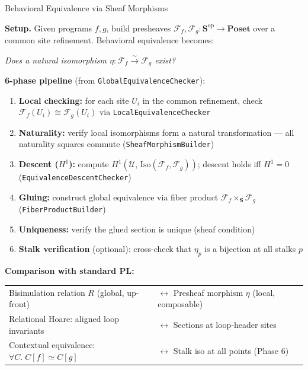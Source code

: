 \documentclass[aspectratio=169,11pt]{beamer}
\newcommand{\Sem}{\mathcal{F}}
\newcommand{\Cat}{\mathbf{S}}
\newcommand{\Poset}{\mathbf{Poset}}
\newcommand{\op}{\mathrm{op}}
\begin{document}
\begin{frame}{Behavioral Equivalence via Sheaf Morphisms}

\textbf{Setup.} Given programs $f, g$, build presheaves
$\Sem_f, \Sem_g : \Cat^{\op} \to \Poset$ over a common site
refinement. Behavioral equivalence becomes:

\vspace{0.2em}
\begin{center}
\emph{Does a natural isomorphism $\eta : \Sem_f \xrightarrow{\sim} \Sem_g$ exist?}
\end{center}

\vspace{0.2em}
\textbf{6-phase pipeline} (from \texttt{GlobalEquivalenceChecker}):

{\small
\begin{enumerate}
  \item \textbf{Local checking:} for each site $U_i$ in the common refinement, check
        $\Sem_f(U_i) \cong \Sem_g(U_i)$ via \texttt{LocalEquivalenceChecker}
  \item \textbf{Naturality:} verify local isomorphisms form a natural transformation —
        all naturality squares commute (\texttt{SheafMorphismBuilder})
  \item \textbf{Descent ($H^1$):} compute $H^1(\mathcal{U},\, \mathrm{Iso}(\Sem_f, \Sem_g))$;
        descent holds iff $H^1 = 0$ (\texttt{EquivalenceDescentChecker})
  \item \textbf{Gluing:} construct global equivalence via fiber product
        $\Sem_f \times_{\Cat} \Sem_g$ (\texttt{FiberProductBuilder})
  \item \textbf{Uniqueness:} verify the glued section is unique (sheaf condition)
  \item \textbf{Stalk verification} (optional): cross-check that
        $\eta_p$ is a bijection at all stalks $p$
\end{enumerate}
}

\vspace{0.3em}
\textbf{Comparison with standard PL:}

{\small
\begin{tabular}{@{}ll@{}}
Bisimulation relation $R$ (global, up-front) & $\longleftrightarrow$ Presheaf morphism $\eta$ (local, composable) \\
Relational Hoare: aligned loop invariants & $\longleftrightarrow$ Sections at loop-header sites \\
Contextual equivalence: $\forall C.\; C[f] \simeq C[g]$ & $\longleftrightarrow$ Stalk iso at all points (Phase 6) \\
\end{tabular}
}

\end{frame}
\end{document}
